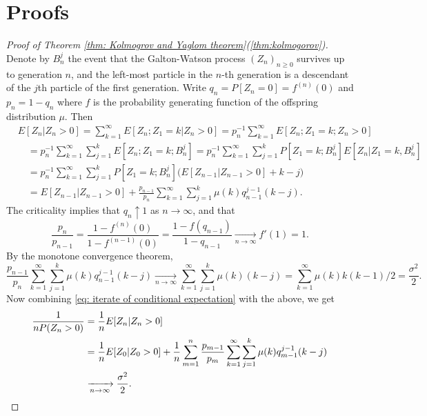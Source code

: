 \documentclass[12pt,a4paper]{amsart}
\numberwithin{equation}{section}
\begin{document}
\section{Proofs}
\label{sec: proofs}
\begin{proof}[Proof of Theorem \ref{thm: Kolmogrov and Yaglom theorem}(\ref{thm:kolmogorov})]
	Denote by $B_n^j$ the event that the Galton-Watson process 
    $(Z_n)_{n\geq 0}$ 
survives up to generation $n$, and the left-most particle in the $n$-th generation is 
	a descendant of the $j$th particle of the first generation.
	Write $q_n = P[Z_n = 0] = f^{(n)}(0)$ and $p_n = 1- q_n$ where $f$ is the probability generating function of the offspring distribution $\mu$.
	Then
\begin{equation}
\label{eq: iterate of conditional expectation}
\begin{split}
	&E[Z_n| Z_n>0]
	= \sum_{k=1}^\infty E[Z_n; Z_1=k| Z_n>0]
	= p_n^{-1} \sum_{k=1}^\infty E[Z_n; Z_1=k;Z_{n}>0]
	\\&\quad = p_n^{-1} \sum_{k=1}^\infty \sum_{j=1}^k E[Z_n; Z_1=k;B_n^j]
	= p_n^{-1} \sum_{k=1}^\infty \sum_{j=1}^k P[Z_1=k;B_n^j] E[Z_n| Z_1=k,B_n^j]
	\\&\quad = p_n^{-1} \sum_{k=1}^\infty \sum_{j=1}^k P[Z_1=k;B_n^j] \Big( E[Z_{n-1}| Z_{n-1}>0] +k-j\Big)
	\\&\quad = E[Z_{n-1}|Z_{n-1}> 0]  + \frac{p_{n-1}}{p_n}\sum_{k=1}^\infty \sum_{j=1}^k \mu(k) q_{n-1}^{j-1}(k-j).
\end{split}
\end{equation}
	The criticality implies that $q_n \uparrow 1$ as $n \to \infty$, and that
\[
	\frac{p_n}{p_{n-1}} = \frac{1- f^{(n)}(0)}{1-f^{(n-1)}(0)} = \frac{1- f(q_{n-1})}{1-q_{n-1}} \xrightarrow[n \to \infty]{} f'(1) = 1.
\]
	By the monotone convergence theorem,
\[
	\frac{p_{n-1}}{p_n} \sum_{k=1}^\infty \sum_{j=1}^k \mu(k) q_{n-1}^{j-1} (k-j)
	\xrightarrow[n \to \infty]{} \sum_{k=1}^\infty \sum_{j=1}^k \mu(k) (k-j)
	=  \sum_{k=1}^\infty \mu(k) k(k-1)/2
	= \frac{\sigma^2}{2}.
\]
	Now combining \eqref{eq: iterate of conditional expectation} with the above, we get
\[\begin{split}
	\frac{1}{n P(Z_n > 0)}
	&= \frac{1}{n} E[Z_n | Z_n > 0]
	\\&= \frac{1}{n}E[Z_0| Z_0 > 0] + \frac{1}{n} \sum_{m = 1}^n \frac{p_{m-1}}{p_m}\sum_{k=1}^\infty \sum_{j=1}^k \mu(k) q_{m-1}^{j-1}(k-j)
	\\& \xrightarrow[n \to \infty]{} \frac{\sigma^2}{2}.
	\qedhere
\end{split}\]
\end{proof}
\end{document}
